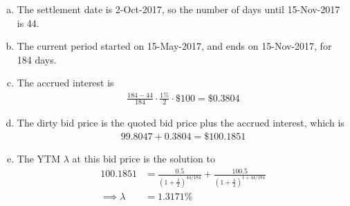 \documentclass{article}
\begin{document}
\begin{enumerate}[1.]
\begin{enumerate}[(a)]
			\item 
				\begin{soln}
					The settlement date is 2-Oct-2017, so the number of days until 15-Nov-2017 is 44.
				\end{soln}

			\item 
				\begin{soln}
					The current period started on 15-May-2017, and ends on 15-Nov-2017, for 184 days.
				\end{soln}

			\item 
				\begin{soln}
					The accrued interest is
					\begin{align*}
						\frac{184-44}{184}\cdot \frac{1\%}{2}\cdot \$100 = \$0.3804
					\end{align*}
				\end{soln}

			\item 
				\begin{soln}
					The dirty bid price is the quoted bid price plus the accrued interest, which is
					\begin{align*}
						99.8047+0.3804=\$100.1851
					\end{align*}
				\end{soln}

			\item 
				\begin{soln}
					The YTM $\lambda$ at this bid price is the solution to
					\begin{align*}
						100.1851 &= \frac{0.5}{\left( 1+\frac{\lambda}{2} \right)^{44/184}} + \frac{100.5}{\left( 1+\frac{\lambda}{2} \right)^{1+44/184}} \\
						\implies \lambda &= 1.3171\%
					\end{align*}
				\end{soln}
				
		\end{enumerate}
		
\end{enumerate}
\end{document}
